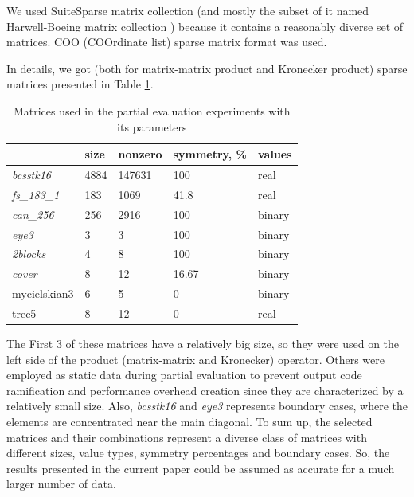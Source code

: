 \documentclass[conference]{IEEEtran}
\begin{document}
We used SuiteSparse matrix collection \cite{davis2011university} (and mostly the subset of it named Harwell-Boeing matrix collection \cite{duff1992users}) because it contains a reasonably diverse set of matrices. COO (COOrdinate list) sparse matrix format was used. 

In details, we got (both for matrix-matrix product and Kronecker product) sparse matrices presented in Table \ref{matrices_tab}.

\begin{table}[H]
\begin{tabular}{|l|l|l|l|l|}
	\hline
	& size & nonzero & symmetry, \% & values \\ \hline
	\textit{bcsstk16}   & 4884 & 147631  & 100          & real   \\ \hline
	\textit{fs\_183\_1} & 183  & 1069    & 41.8         & real   \\ \hline
	\textit{can\_256}   & 256  & 2916    & 100          & binary \\ \hline
	\textit{eye3}       & 3    & 3       & 100          & binary \\ \hline
	\textit{2blocks}    & 4    & 8       & 100          & binary \\ \hline
	\textit{cover}      & 8    & 12      & 16.67        & binary \\ \hline
	mycielskian3        & 6    & 5       & 0            & binary \\ \hline
	trec5               & 8    & 12      & 0            & real   \\ \hline
\end{tabular} \bigskip
\centering
\caption{Matrices used in the partial evaluation experiments with its parameters}
\label{matrices_tab}
\end{table}

The First 3 of these matrices have a relatively big size, so they were used on the left side of the product (matrix-matrix and Kronecker) operator. Others were employed as static data during partial evaluation to prevent output code ramification and performance overhead creation since they are characterized by a relatively small size. Also, \textit{bcsstk16} and \textit{eye3} represents boundary cases, where the elements are concentrated near the main diagonal. To sum up, the selected matrices and their combinations represent a diverse class of matrices with different sizes, value types, symmetry percentages and boundary cases. So, the results presented in the current paper could be assumed as accurate for a much larger number of data.
\end{document}
